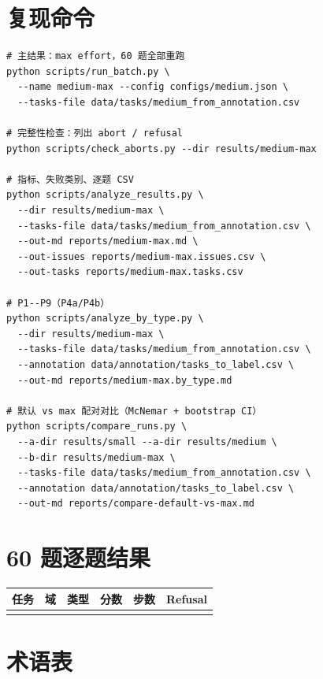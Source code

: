 \documentclass[UTF8,a4paper,11pt]{ctexart}
\begin{document}
\section{复现命令}
\label{sec:reproduce}

{\footnotesize
\begin{verbatim}
# 主结果：max effort，60 题全部重跑
python scripts/run_batch.py \
  --name medium-max --config configs/medium.json \
  --tasks-file data/tasks/medium_from_annotation.csv

# 完整性检查：列出 abort / refusal
python scripts/check_aborts.py --dir results/medium-max

# 指标、失败类别、逐题 CSV
python scripts/analyze_results.py \
  --dir results/medium-max \
  --tasks-file data/tasks/medium_from_annotation.csv \
  --out-md reports/medium-max.md \
  --out-issues reports/medium-max.issues.csv \
  --out-tasks reports/medium-max.tasks.csv

# P1--P9（P4a/P4b）
python scripts/analyze_by_type.py \
  --dir results/medium-max \
  --tasks-file data/tasks/medium_from_annotation.csv \
  --annotation data/annotation/tasks_to_label.csv \
  --out-md reports/medium-max.by_type.md

# 默认 vs max 配对对比（McNemar + bootstrap CI）
python scripts/compare_runs.py \
  --a-dir results/small --a-dir results/medium \
  --b-dir results/medium-max \
  --tasks-file data/tasks/medium_from_annotation.csv \
  --annotation data/annotation/tasks_to_label.csv \
  --out-md reports/compare-default-vs-max.md
\end{verbatim}
}

\section{60 题逐题结果}
\label{sec:pertask}

{\scriptsize
\begin{longtable}{>{\raggedright\arraybackslash}p{6.2cm}llrrc}
\toprule
任务 & 域 & 类型 & 分数 & 步数 & Refusal \\
\midrule
\endhead
\bottomrule
\endfoot
\PerTaskRows
\end{longtable}

}

\section{术语表}
\end{document}
